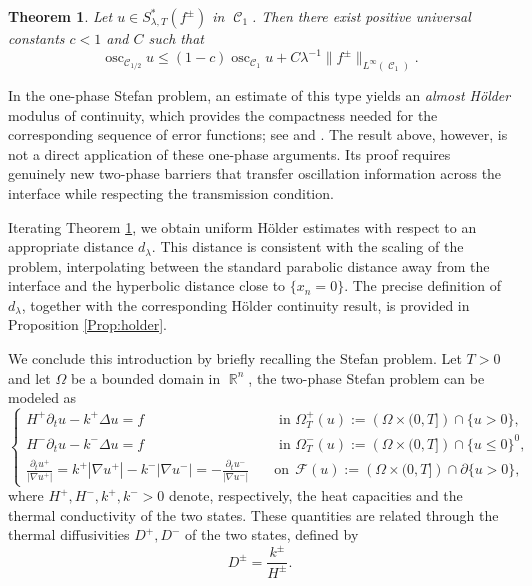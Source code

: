 \documentclass[12pt]{article}
\newcommand{\nor}[1]{\left\lvert#1\right\rvert}
\newtheorem{Theorem}{Theorem}
\numberwithin{Theorem}{section}
\theoremstyle{definition}
\theoremstyle{remark}
\numberwithin{equation}{section}
\DeclareMathOperator{\C}{\mathcal{C}}
\DeclareMathOperator{\R}{\mathbb{R}}
\newcommand{\osc}{\operatorname{osc}}
\begin{document}
\begin{Theorem}\label{Lm:Harnack}
    Let $u \in S^*_{\lambda,T}(f^{\pm})$ in $\C_1$. Then there exist positive universal constants $c < 1$ and $C$ such that
    \[
    \osc_{\C_{1/2}} u \leq (1-c) \osc_{\C_1} u + C \lambda^{-1}\|f^\pm\|_{L^\infty(\C_1)}.
    \]
\end{Theorem}


In the one-phase Stefan problem, an estimate of this type yields an \textit{almost H\"older} modulus of continuity, which provides the compactness needed for the corresponding sequence of error functions; see \cite[Theorem 5.4]{DFS23} and \cite[Proposition 4.8]{ferrari2026free}. The result above, however, is not a direct application of these one-phase arguments. Its proof requires genuinely new two-phase barriers that transfer oscillation information across the interface while respecting the transmission condition.


Iterating Theorem \ref{Lm:Harnack}, we obtain uniform H\"older estimates with respect to an appropriate distance $d_\lambda$. This distance is consistent with the scaling of the problem, interpolating between the standard parabolic distance away from the interface and the hyperbolic distance close to $\{ x_n=0 \}$. The precise definition of $d_\lambda$, together with the corresponding H\"older continuity result, is provided in  Proposition \ref{Prop:holder}.

We conclude this introduction by briefly recalling the Stefan problem.
Let $T>0$ and let $\Omega$ be a bounded domain in $\R^n$, the two-phase Stefan problem can be modeled as
\begin{equation}\label{eq:twophaseStef}
 \begin{cases}
     H^+\partial_tu - k^{+}\Delta u=f& \quad \text{ in } \Omega_T^+(u):=\left( \Omega \times (0,T] \right) \cap \{u>0\},\\ H^{-}\partial_tu -  k^{-}\Delta u =f& \quad \text{ in }\Omega_T^-(u):=\left( \Omega \times (0,T] \right) \cap \{u\leq 0\}^0,  \\
     \displaystyle \frac{ \partial_{t} u^+}{\nor{\nabla u^+}} = k^{+} \nor{\nabla u^+}- k^{-}\nor{\nabla u^-} = -\frac{ \partial_{t} u^-}{\nor{\nabla u^-}} & \quad \text{on}\:\: \mathcal{F}(u):=\left(\Omega \times (0,T] \right) \cap \partial\{ u > 0  \},
 \end{cases}
 \end{equation} 
 where $H^+,H^-,k^{+},k^{-}>0$ denote, respectively,  the heat capacities  and the thermal conductivity of the two states. These quantities are related through the thermal diffusivities $D^{+},D^{-}$ of the two states, defined by
 \[
 D^{\pm} = \frac{k^{\pm}}{H^{\pm}}.
 \]
\end{document}
